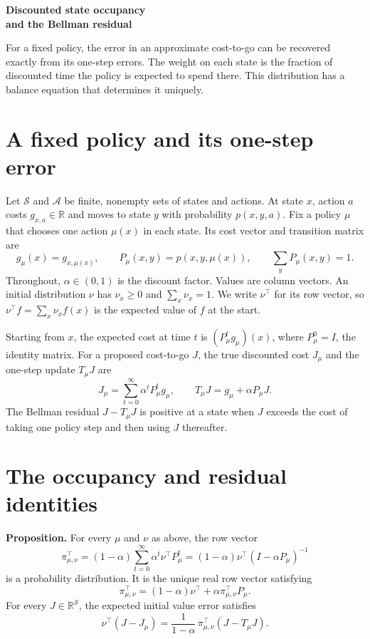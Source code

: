 \documentclass[12pt,a4paper]{article}
\newcommand{\R}{\mathbb R}
\begin{document}
{\LARGE\bfseries Discounted state occupancy\\[2pt] and the Bellman residual\par}
\medskip
For a fixed policy, the error in an approximate cost-to-go can be recovered
exactly from its one-step errors. The weight on each state is the fraction
of discounted time the policy is expected to spend there. This distribution has a
balance equation that determines it uniquely.

\section*{A fixed policy and its one-step error}
Let \(\mathcal S\) and \(\mathcal A\) be finite, nonempty sets of states and
actions. At state \(x\), action \(a\) costs \(g_{x,a}\in\R\) and moves to
state \(y\) with probability \(p(x,y,a)\). Fix a policy \(\mu\) that chooses
one action \(\mu(x)\) in each state. Its cost vector and transition matrix are
\[
  g_\mu(x)=g_{x,\mu(x)},\qquad
  P_\mu(x,y)=p(x,y,\mu(x)),\qquad \sum_y P_\mu(x,y)=1.
\]
Throughout, \(\alpha\in(0,1)\) is the discount factor. Values are column
vectors. An initial distribution \(\nu\) has \(\nu_x\ge0\) and
\(\sum_x\nu_x=1\). We write \(\nu^\top\) for its row vector, so
\(\nu^\top f=\sum_x\nu_x f(x)\) is the expected value of \(f\) at the start.

Starting from \(x\), the expected cost at time \(t\) is \((P_\mu^t g_\mu)(x)\),
where \(P_\mu^0=I\), the identity matrix. For a proposed cost-to-go \(J\),
the true discounted cost \(J_\mu\) and the one-step update \(T_\mu J\) are
\[
 J_\mu=\sum_{t=0}^{\infty}\alpha^t P_\mu^t g_\mu,
 \qquad T_\mu J=g_\mu+\alpha P_\mu J .
\]
The Bellman residual \(J-T_\mu J\) is positive at a state when \(J\)
exceeds the cost of taking one policy step and then using \(J\) thereafter.

\section*{The occupancy and residual identities}
\textbf{Proposition.} For every \(\mu\) and \(\nu\) as above, the row vector
\begin{equation}
 \pi_{\mu,\nu}^{\top}
 =(1-\alpha)\sum_{t=0}^{\infty}\alpha^t\nu^\top P_\mu^t
 =(1-\alpha)\nu^\top(I-\alpha P_\mu)^{-1}
 \label{eq:occ}
\end{equation}
is a probability distribution. It is the unique real row vector satisfying
\begin{equation}
 \pi_{\mu,\nu}^{\top}=(1-\alpha)\nu^\top+\alpha\pi_{\mu,\nu}^{\top}P_\mu .
 \label{eq:balance}
\end{equation}
For every \(J\in\R^{\mathcal S}\), the expected initial value error satisfies
\begin{equation}
 \nu^\top(J-J_\mu)
   =\frac{1}{1-\alpha}\,\pi_{\mu,\nu}^{\top}(J-T_\mu J).
 \label{eq:residual}
\end{equation}
\end{document}
